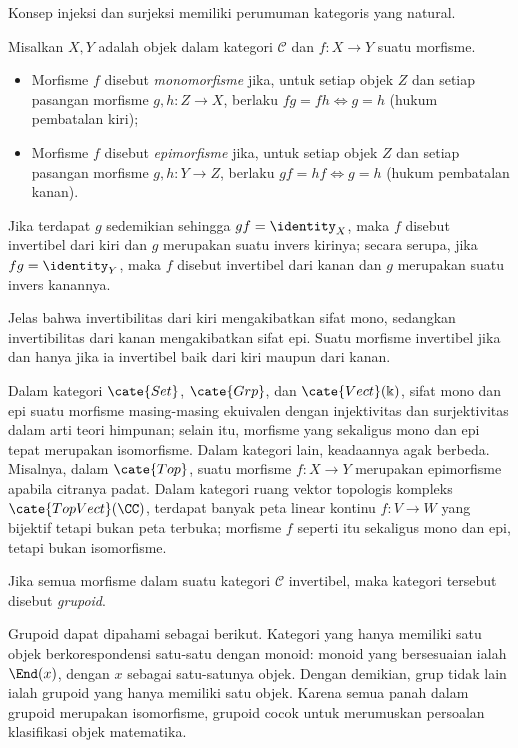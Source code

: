 Konsep injeksi dan surjeksi memiliki perumuman kategoris yang natural.
\begin{definition}
	Misalkan $X,Y$ adalah objek dalam kategori $\mathcal{C}$ dan $f: X \to Y$ suatu morfisme.
	\begin{itemize}
		\item Morfisme $f$ disebut \emph{monomorfisme} jika, untuk setiap objek $Z$ dan setiap pasangan morfisme $g,h: Z \to X$, berlaku $fg = fh \iff g=h$ (hukum pembatalan kiri);
		\item Morfisme $f$ disebut \emph{epimorfisme} jika, untuk setiap objek $Z$ dan setiap pasangan morfisme $g,h: Y \to Z$, berlaku $gf = hf \iff g=h$ (hukum pembatalan kanan).
	\end{itemize}
	Jika terdapat $g$ sedemikian sehingga $gf=\identity_X$, maka $f$ disebut invertibel dari kiri dan $g$ merupakan suatu invers kirinya; secara serupa, jika $fg = \identity_Y$, maka $f$ disebut invertibel dari kanan dan $g$ merupakan suatu invers kanannya.
\end{definition}
Jelas bahwa invertibilitas dari kiri mengakibatkan sifat mono, sedangkan invertibilitas dari kanan mengakibatkan sifat epi. Suatu morfisme invertibel jika dan hanya jika ia invertibel baik dari kiri maupun dari kanan.

Dalam kategori $\cate{Set}$, $\cate{Grp}$, dan $\cate{Vect}(\Bbbk)$, sifat mono dan epi suatu morfisme masing-masing ekuivalen dengan injektivitas dan surjektivitas dalam arti teori himpunan; selain itu, morfisme yang sekaligus mono dan epi tepat merupakan isomorfisme. Dalam kategori lain, keadaannya agak berbeda. Misalnya, dalam $\cate{Top}$, suatu morfisme $f: X \to Y$ merupakan epimorfisme apabila citranya padat. Dalam kategori ruang vektor topologis kompleks $\cate{TopVect}(\CC)$, terdapat banyak peta linear kontinu $f: V \to W$ yang bijektif tetapi bukan peta terbuka; morfisme $f$ seperti itu sekaligus mono dan epi, tetapi bukan isomorfisme.

\begin{definition}
	Jika semua morfisme dalam suatu kategori $\mathcal{C}$ invertibel, maka kategori tersebut disebut \emph{grupoid}.
\end{definition}

Grupoid dapat dipahami sebagai berikut. Kategori yang hanya memiliki satu objek berkorespondensi satu-satu dengan monoid: monoid yang bersesuaian ialah $\End(x)$, dengan $x$ sebagai satu-satunya objek. Dengan demikian, grup tidak lain ialah grupoid yang hanya memiliki satu objek. Karena semua panah dalam grupoid merupakan isomorfisme, grupoid cocok untuk merumuskan persoalan klasifikasi objek matematika.

